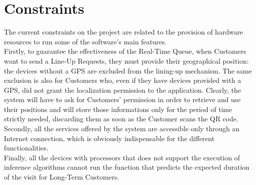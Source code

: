 \section{Constraints}

The current constraints on the project are related to the provision of hardware resources to run some of the software's main features.\\
Firstly, to guarantee the effectiveness of the Real-Time Queue, when Customers want to send a Line-Up Requests, they must provide their geographical position: the devices without a GPS are excluded from the lining-up mechanism. The same exclusion is also for Customers who, even if they have devices provided with a GPS, did not grant the localization permission to the application. Clearly, the system will have to ask for Customers' permission in order to retrieve and use their positions and will store those informations only for the period of time strictly needed, discarding them as soon as the Customer scans the QR code.\\
Secondly, all the services offered by the system are accessible only through an Internet connection, which is obviously indispensable for the different functionalities.\\ 
Finally, all the devices with processors that does not support the execution of inference algorithms cannot run the function that predicts the expected duration of the visit for Long-Term Customers.


 
 